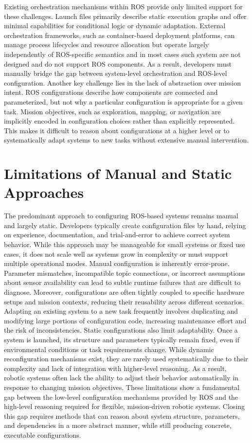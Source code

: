 Existing orchestration mechanisms within ROS provide only limited support for these challenges. Launch files primarily describe static execution
graphs and offer minimal capabilities for conditional logic or dynamic adaptation. External orchestration frameworks, such as container-based 
deployment platforms, can manage process lifecycles and resource allocation but operate largely independently of ROS-specific semantics and in most 
cases such system are not designed and do not support ROS components. As a result, developers must manually bridge the gap between system-level
orchestration and ROS-level configuration. Another key challenge lies in the lack of abstraction over mission intent. ROS configurations describe 
how components are connected and parameterized, but not why a particular configuration is appropriate for a given task. Mission objectives, such as 
exploration, mapping, or navigation are implicitly encoded in configuration choices rather than explicitly represented. This makes it difficult to
reason about configurations at a higher level or to systematically adapt systems to new tasks without extensive manual intervention.

\section{Limitations of Manual and Static Approaches}
The predominant approach to configuring ROS-based systems remains manual and largely static. Developers typically create configuration files by hand,
relying on experience, documentation, and trial-and-error to achieve correct system behavior. While this approach may be manageable for small systems 
or fixed use cases, it does not scale well as systems grow in complexity or must support multiple operational modes. Manual configuration is inherently
error-prone. Parameter mismatches, incompatible topic connections, or incorrect assumptions about sensor availability can lead to subtle runtime 
failures that are difficult to diagnose. Moreover, configurations are often tightly coupled to specific hardware setups and mission contexts, reducing
their reusability across different scenarios. Adapting an existing system to a new task frequently involves duplicating and modifying large portions 
of configuration code, increasing maintenance effort and the risk of inconsistencies. Static configurations also limit adaptability. Once a system is
launched, its structure and parameters typically remain fixed, even if environmental conditions or task requirements change. While dynamic 
reconfiguration mechanisms exist, they are rarely used systematically due to their complexity and lack of integration with higher-level reasoning.
As a result, robotic systems often lack the ability to adjust their behavior automatically in response to changing mission objectives. These limitations
show a fundamental gap between the low-level configuration mechanisms provided by ROS and the high-level reasoning required for flexible, 
mission-driven robotic systems. Closing this gap requires methods that can reason about system structure, parameters, and dependencies in a 
more abstract manner, while still producing concrete, executable configurations.

